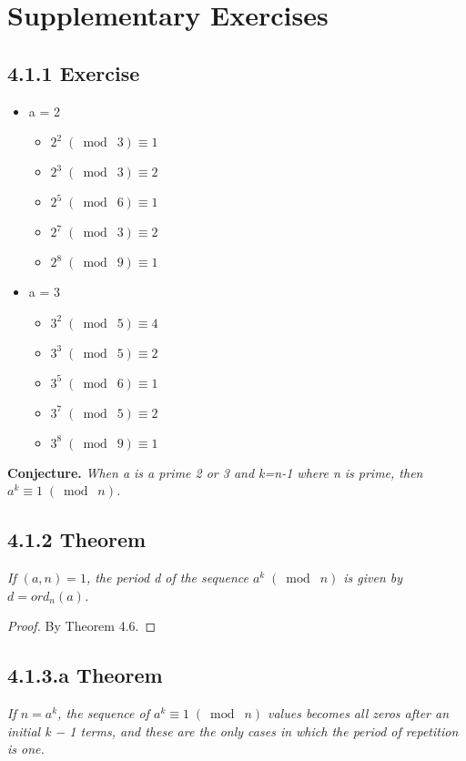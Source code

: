 \documentclass{article}
\begin{document}
\section*{Supplementary Exercises}
\subsection*{4.1.1 Exercise} 

\begin{itemize}
    \item a = 2
    \begin{itemize}
        \item $2^2 \;(\bmod\; 3) \equiv 1$
        \item $2^3 \;(\bmod\; 3) \equiv 2$
        \item $2^5 \;(\bmod\; 6) \equiv 1$
        \item $2^7 \;(\bmod\; 3) \equiv 2$
        \item $2^8 \;(\bmod\; 9) \equiv 1$
    \end{itemize}
    \item a = 3
    \begin{itemize}
        \item $3^2 \;(\bmod\; 5) \equiv 4$
        \item $3^3 \;(\bmod\; 5) \equiv 2$
        \item $3^5 \;(\bmod\; 6) \equiv 1$
        \item $3^7 \;(\bmod\; 5) \equiv 2$
        \item $3^8 \;(\bmod\; 9) \equiv 1$
    \end{itemize}
\end{itemize}

\textbf{Conjecture.} \textit{When a is a prime 2 or 3 and k=n-1 where n is prime, then $a^{k} \equiv 1 \;(\bmod\; n)$.}

\subsection*{4.1.2 Theorem} 
\quad \textit{If $(a,n) = 1$, the period d of the sequence $a^k \;(\bmod\; n)$ is given by $d = ord_n(a)$.}

\begin{proof}
By Theorem 4.6.
\end{proof}

\subsection*{4.1.3.a Theorem} 
\quad \textit{If $n = a^k$, the sequence of $a^{k} \equiv 1 \;(\bmod\; n)$ values becomes all zeros after an initial k − 1 terms, and these are the only cases in which the period of repetition is one.}
\end{document}
